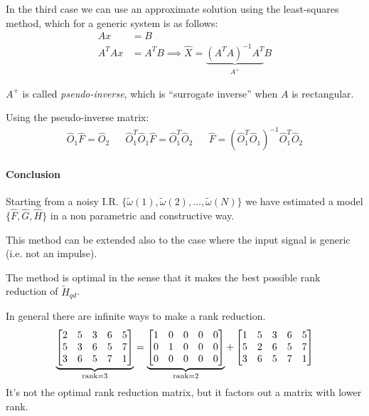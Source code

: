 In the third case we can use an approximate solution using the least-squares method, which for a generic system is as follows:
\begin{align*}
    Ax &= B \\
    A^TAx &= A^TB \implies \hat{X} = \underbrace{(A^TA)^{-1}A^T}_{A^+} B
\end{align*}

$A^+$ is called \emph{pseudo-inverse}, which is ``surrogate inverse'' when $A$ is rectangular.

Using the pseudo-inverse matrix:
\begin{align*}
    \hat{O}_1\hat{F} = \hat{O}_2 &&
    \hat{O}_1^T\hat{O}_1\hat{F} = \hat{O}_1^T\hat{O}_2 &&
    \hat{F} = \left(\hat{O}_1^T\hat{O}_1\right)^{-1} \hat{O}_1^T\hat{O}_2
\end{align*}


\paragraph{Conclusion} Starting from a noisy I.R. $\{\widetilde{\omega}(1), \widetilde{\omega}(2), \ldots, \widetilde{\omega}(N)\}$ we have estimated a model $\{\hat{F}, \hat{G}, \hat{H}\}$ in a non parametric and constructive way.

\begin{remark}
    This method can be extended also to the case where the input signal is generic (i.e. not an impulse).
\end{remark}

\begin{remark}
    The method is optimal in the sense that it makes the best possible rank reduction of $\tilde{H}_{qd}$.
\end{remark}

\begin{example}
    In general there are infinite ways to make a rank reduction.
    \[
        \underbrace{\begin{bmatrix}
            2 & 5 & 3 & 6 & 5 \\
            5 & 3 & 6 & 5 & 7 \\
            3 & 6 & 5 & 7 & 1
        \end{bmatrix}}_{\operatorname*{rank} = 3}
        =
        \underbrace{\begin{bmatrix}
            1 & 0 & 0 & 0 & 0 \\
            0 & 1 & 0 & 0 & 0 \\
            0 & 0 & 0 & 0 & 0
        \end{bmatrix}}_{\operatorname*{rank} = 2}
        +
        \begin{bmatrix}
            1 & 5 & 3 & 6 & 5 \\
            5 & 2 & 6 & 5 & 7 \\
            3 & 6 & 5 & 7 & 1
        \end{bmatrix}
    \]
    It's not the optimal rank reduction matrix, but it factors out a matrix with lower rank.
\end{example}


